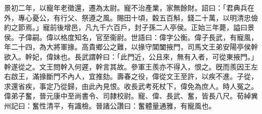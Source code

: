 \begin{pinyinscope}
景初二年，以寵年老徵還，遷為太尉。寵不治產業，家無餘財。詔曰：「君典兵在外，專心憂公，有行父、祭遵之風。賜田十頃，糓五百斛，錢二十萬，以明清忠儉約之節焉。」寵前後增邑，凡九千六百戶，封子孫二人亭侯。正始三年薨，謚曰景侯。子偉嗣。偉以格度知名，官至衞尉。世語曰：偉字公衡。偉子長武，有寵風，年二十四，為大將軍掾。高貴鄉公之難，以掾守閶闔掖門，司馬文王弟安陽亭侯幹欲入。幹妃，偉妹也。長武謂幹曰：「此門近，公且來，無有入者，可從東掖門。」幹遂從之。文王問幹入何遲，幹言其故。參軍王羨亦不得入，恨之。旣而羨因王左右啟王，滿掾斷門不內人，宜推劾。壽春之役，偉從文王至許，以疾不進。子從，求還省疾，事定乃從歸，由此內見恨。收長武考死杖下，偉免為庶人。時人冤之。偉弟子奮，晉元康中至尚書令、司隷校尉。寵、偉、長武、奮，皆長八尺。荀綽兾州記曰：奮性清平，有識檢。晉諸公讚曰：奮體量通雅，有寵風也。


\end{pinyinscope}